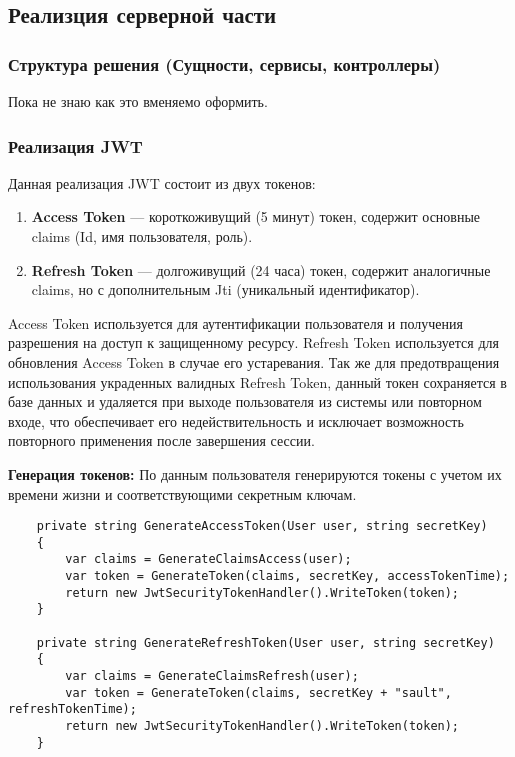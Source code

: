 \subsection{Реализция серверной части}

\subsubsection{Структура решения (Сущности, сервисы, контроллеры)}

Пока не знаю как это вменяемо оформить.

\subsubsection{Реализация JWT}
Данная реализация JWT состоит из двух токенов:
\begin{enumerate}
	\item{\textbf{Access Token} --- короткоживущий (5 минут) токен, содержит основные claims (Id, имя пользователя, роль).}
	\item{\textbf{Refresh Token} --- долгоживущий (24 часа) токен, содержит аналогичные claims, но с дополнительным Jti (уникальный идентификатор).}
\end{enumerate}

Access Token используется для аутентификации пользователя и получения разрешения на доступ к защищенному ресурсу. Refresh Token используется для обновления Access Token в случае его устаревания. Так же для предотвращения использования украденных валидных Refresh Token, данный токен сохраняется в базе данных и удаляется при выходе пользователя из системы или повторном входе, что обеспечивает его недействительность и исключает возможность повторного применения после завершения сессии.

\textbf{Генерация токенов:} По данным пользователя генерируются токены с учетом их времени жизни и соответствующими секретным ключам.
\begin{verbatim}
    private string GenerateAccessToken(User user, string secretKey)
    {
        var claims = GenerateClaimsAccess(user);
        var token = GenerateToken(claims, secretKey, accessTokenTime);
        return new JwtSecurityTokenHandler().WriteToken(token);
    }

    private string GenerateRefreshToken(User user, string secretKey)
    {
        var claims = GenerateClaimsRefresh(user);
        var token = GenerateToken(claims, secretKey + "sault", refreshTokenTime);
        return new JwtSecurityTokenHandler().WriteToken(token);
    }
\end{verbatim}

